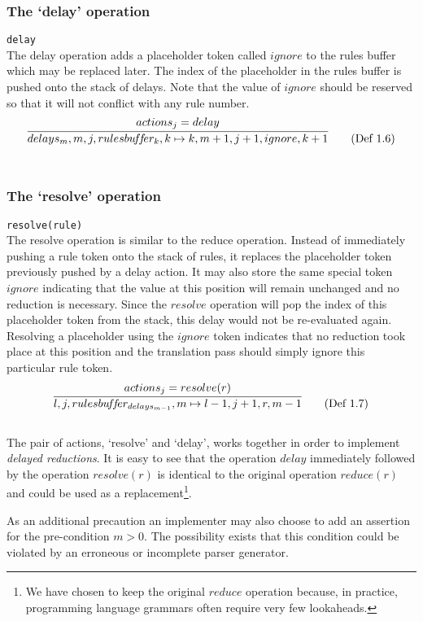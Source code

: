 \documentclass[envcountsame,runningheads]{llncs}
\begin{document}
\subsubsection{The `delay' operation}
\texttt{delay}\\
The delay operation adds a placeholder token called $ignore$ to the rules buffer which may be replaced later.
The index of the placeholder in the rules buffer is pushed onto the stack of delays.
Note that the value of $ignore$ should be reserved so that it will not conflict with any rule number.
\begin{equation}
\infer{delays_m, m, j, rulesbu\!f\!f\!er_k, k \mapsto k, m+1, j+1, ignore, k+1}{actions_j = delay} \tag{Def 1.6}
\end{equation}\\

\subsubsection{The `resolve' operation}
\texttt{resolve(rule)}\\
The resolve operation is similar to the reduce operation. 
Instead of immediately pushing a rule token onto the stack of rules, it replaces the placeholder token previously pushed by a delay action.
It may also store the same special token $ignore$ indicating that the value at this position will remain unchanged and no reduction is necessary. 
Since the $resolve$ operation will pop the index of this placeholder token from the stack, this delay would not be re-evaluated again. 
Resolving a placeholder using the $ignore$ token indicates that no reduction took place at this position and the translation pass should simply ignore this particular rule token.
\begin{equation}
\infer{l, j, rulesbu\!f\!f\!er_{delays_{m-1}}, m \mapsto l-1, j+1, r, m-1}{actions_j = resolve(r)} \tag{Def 1.7}
\end{equation}\\

The pair of actions, `resolve' and `delay', works together in order to implement \emph{delayed reductions}. 
It is easy to see that the operation $delay$ immediately followed by the operation $resolve(r)$ is identical to the original operation $reduce(r)$ and could be used as a replacement\footnote{We have chosen to keep the original $reduce$ operation because, in practice, programming language grammars often require very few lookaheads.}.

As an additional precaution an implementer may also choose to add an assertion for the pre-condition $m > 0$. The possibility exists that this condition could be violated by an erroneous or incomplete parser generator.
\end{document}

